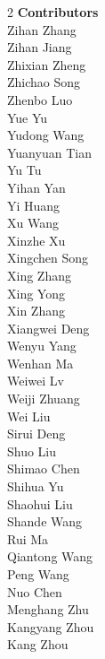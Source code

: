 \begin{multicols}{2}
\noindent
\textbf{\color{ourblue} Contributors} \\
\color{ourblue} Zihan Zhang \\
\color{ourblue} Zihan Jiang \\
\color{ourblue} Zhixian Zheng \\
\color{ourblue} Zhichao Song \\
\color{ourblue} Zhenbo Luo \\
\color{ourblue} Yue Yu \\
\color{ourblue} Yudong Wang \\
\color{ourblue} Yuanyuan Tian \\
\color{ourblue} Yu Tu \\
\color{ourblue} Yihan Yan \\
\color{ourblue} Yi Huang \\
\color{ourblue} Xu Wang \\
\color{ourblue} Xinzhe Xu \\
\color{ourblue} Xingchen Song \\
\color{ourblue} Xing Zhang \\
\color{ourblue} Xing Yong \\
\color{ourblue} Xin Zhang \\
\color{ourblue} Xiangwei Deng \\
\color{ourblue} Wenyu Yang \\
\color{ourblue} Wenhan Ma \\
\color{ourblue} Weiwei Lv \\
\color{ourblue} Weiji Zhuang \\
\color{ourblue} Wei Liu  \\
\color{ourblue} Sirui Deng \\
\color{ourblue} Shuo Liu \\
\color{ourblue} Shimao Chen \\
\color{ourblue} Shihua Yu \\
\color{ourblue} Shaohui Liu \\
\color{ourblue} Shande Wang  \\
\color{ourblue} Rui Ma \\
\color{ourblue} Qiantong Wang \\
\color{ourblue} Peng Wang \\
\color{ourblue} Nuo Chen \\
\color{ourblue} Menghang Zhu \\
\color{ourblue} Kangyang Zhou \\
\color{ourblue} Kang Zhou  \\

\end{multicols}

